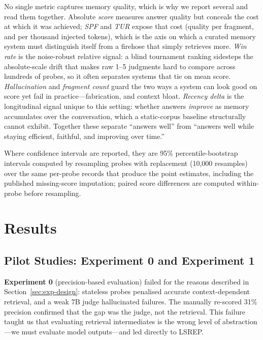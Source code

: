 \documentclass[11pt,a4paper]{article}
\begin{document}
No single metric captures memory quality, which is why we report several and read them together. Absolute \emph{score} measures answer quality but conceals the cost at which it was achieved; \emph{SPF} and \emph{TUR} expose that cost (quality per fragment, and per thousand injected tokens), which is the axis on which a curated memory system must distinguish itself from a firehose that simply retrieves more. \emph{Win rate} is the noise-robust relative signal: a blind tournament ranking sidesteps the absolute-scale drift that makes raw 1--5 judgments hard to compare across hundreds of probes, so it often separates systems that tie on mean score. \emph{Hallucination} and \emph{fragment count} guard the two ways a system can look good on score yet fail in practice---fabrication, and context bloat. \emph{Recency delta} is the longitudinal signal unique to this setting: whether answers \emph{improve} as memory accumulates over the conversation, which a static-corpus baseline structurally cannot exhibit. Together these separate ``answers well'' from ``answers well while staying efficient, faithful, and improving over time.''

Where confidence intervals are reported, they are 95\% percentile-bootstrap intervals computed by resampling probes with replacement (10{,}000 resamples) over the same per-probe records that produce the point estimates, including the published missing-score imputation; paired score differences are computed within-probe before resampling.

\section{Results}
\label{sec:results}

\subsection{Pilot Studies: Experiment 0 and Experiment 1}
\label{sec:exp1}

\textbf{Experiment 0} (precision-based evaluation) failed for the reasons described in Section~\ref{sec:exp-design}: stateless probes penalised accurate context-dependent retrieval, and a weak 7B judge hallucinated failures. The manually re-scored 31\% precision confirmed that the gap was the judge, not the retrieval. This failure taught us that evaluating retrieval intermediates is the wrong level of abstraction---we must evaluate model outputs---and led directly to LSREP.
\end{document}
